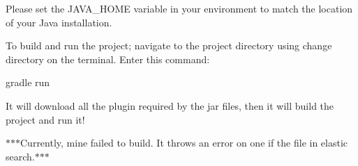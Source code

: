 Please set the J\+A\+V\+A\+\_\+\+H\+O\+ME variable in your environment to match the location of your Java installation.

To build and run the project; navigate to the project directory using change directory on the terminal. Enter this command\+: \begin{DoxyVerb}gradle run
\end{DoxyVerb}


It will download all the plugin required by the jar files, then it will build the project and run it!

$\ast$$\ast$$\ast$\+Currently, mine failed to build. It throws an error on one if the file in elastic search.$\ast$$\ast$$\ast$ 